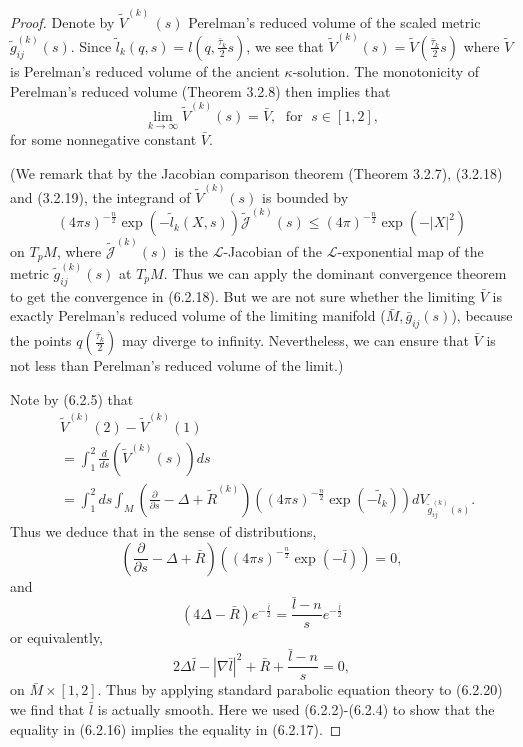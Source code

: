 \begin{proof}
Denote\; by\; $\tilde{V}^{(k)}\,(s)$\; Perelman's\; reduced\;
volume\; of\; the\; scaled\; metric $\tilde{g}_{ij}^{(k)}(s)$.
Since $\tilde{l}_k(q,s)=l(q,\frac{\bar{\tau}_k}{2}s)$, we see that
$\tilde{V}^{(k)}(s)=\tilde{V}(\frac{\bar{\tau}_k}{2}s)$ where
$\tilde{V}$ is Perelman's reduced volume of the ancient
$\kappa$-solution. The monotonicity of Perelman's reduced volume
(Theorem 3.2.8) then implies that \begin{equation}
\lim_{k\rightarrow\infty}\tilde{V}^{(k)}(s)=\bar{V}, \;
\mbox{ for }\; s\in[1,2],  %
\end{equation} for some nonnegative constant $\bar{V}$.

(We remark that by the Jacobian comparison theorem (Theorem
3.2.7), (3.2.18) and (3.2.19), the integrand of
$\tilde{V}^{(k)}(s)$ is bounded by
$$
(4\pi s)^{-\frac{n}{2}}\exp(-\tilde{l}_k(X,s))
\tilde{\mathcal{J}}^{(k)}(s) \leq (4\pi)^{-\frac{n}{2}}
\exp(-|X|^2)
$$
on $T_pM$, where $\tilde{\mathcal{J}}^{(k)}(s)$ is the
$\mathcal{L}$-Jacobian of the $\mathcal{L}$-exponential map of the
metric $\tilde{g}_{ij}^{(k)}(s)$ at $T_pM$. Thus we can apply the
dominant convergence theorem to get the convergence in (6.2.18).
But we are not sure whether the limiting $\bar{V}$ is exactly
Perelman's reduced volume of the limiting manifold
($\bar{M},\bar{g}_{ij}(s)$), because the points
$q(\frac{\bar{\tau}_k}{2})$ may diverge to infinity. Nevertheless,
we can ensure that $\bar{V}$ is not less than Perelman's reduced
volume of the limit.)

Note by (6.2.5) that
\begin{align}
& \tilde{V}^{(k)}(2)-\tilde{V}^{(k)}(1)\\[1mm]
& = \int_{1}^2\frac{d}{ds}(\tilde{V}^{(k)}(s))ds \nonumber\\[1mm]
& = \int_{1}^2ds\int_M\left(\frac{\partial}{\partial s}
-\Delta+\tilde{R}^{(k)}\right) \left((4\pi s)^{-\frac{n}{2}}
\exp(-\tilde{l}_k)\right)dV_{\tilde{g}_{ij}^{(k)}(s)}. \nonumber
\end{align}
Thus we deduce that in the sense of distributions, \begin{equation}
\left(\frac{\partial}{\partial s}-\Delta+\bar{R}\right) \left((4\pi
s)^{-\frac{n}{2}}\exp(-\bar{l})\right)= 0,
\end{equation} and
$$
(4\Delta-\bar{R})e^{-\frac{\bar{l}}{2}}
=\frac{\bar{l}-n}{s}e^{-\frac{\bar{l}}{2}}
$$
or equivalently, \begin{equation} 2\Delta \bar{l} - |\nabla \bar{l}|^2 +
\bar{R}
+ \frac{\bar{l} -n}{s} = 0, %
\end{equation} on $\bar{M} \times [1,2]$. Thus by applying standard parabolic
equation theory to (6.2.20) we find that $\bar{l}$ is actually
smooth. Here we used (6.2.2)-(6.2.4) to show that the equality in
(6.2.16) implies the equality in (6.2.17).


\end{proof}
